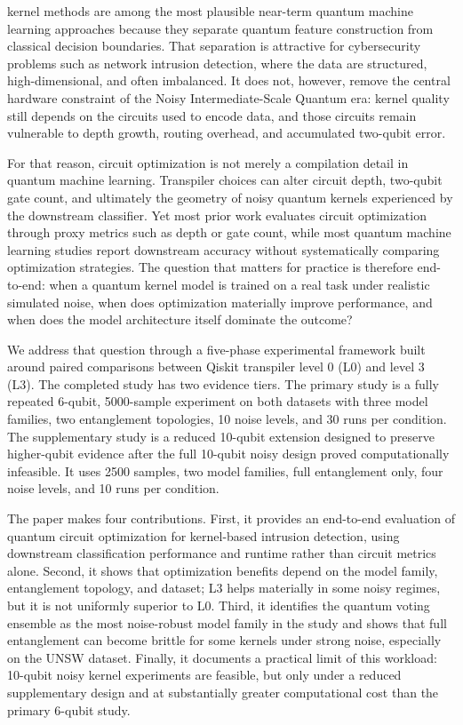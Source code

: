\documentclass{ieeeaccess}
\begin{document}
 kernel methods are among the most plausible near-term quantum machine learning approaches because they separate quantum feature construction from classical decision boundaries. That separation is attractive for cybersecurity problems such as network intrusion detection, where the data are structured, high-dimensional, and often imbalanced. It does not, however, remove the central hardware constraint of the Noisy Intermediate-Scale Quantum era: kernel quality still depends on the circuits used to encode data, and those circuits remain vulnerable to depth growth, routing overhead, and accumulated two-qubit error.

For that reason, circuit optimization is not merely a compilation detail in quantum machine learning. Transpiler choices can alter circuit depth, two-qubit gate count, and ultimately the geometry of noisy quantum kernels experienced by the downstream classifier. Yet most prior work evaluates circuit optimization through proxy metrics such as depth or gate count, while most quantum machine learning studies report downstream accuracy without systematically comparing optimization strategies. The question that matters for practice is therefore end-to-end: when a quantum kernel model is trained on a real task under realistic simulated noise, when does optimization materially improve performance, and when does the model architecture itself dominate the outcome?

We address that question through a five-phase experimental framework built around paired comparisons between Qiskit transpiler level 0 (L0) and level 3 (L3). The completed study has two evidence tiers. The primary study is a fully repeated 6-qubit, 5000-sample experiment on both datasets with three model families, two entanglement topologies, 10 noise levels, and 30 runs per condition. The supplementary study is a reduced 10-qubit extension designed to preserve higher-qubit evidence after the full 10-qubit noisy design proved computationally infeasible. It uses 2500 samples, two model families, full entanglement only, four noise levels, and 10 runs per condition.

The paper makes four contributions. First, it provides an end-to-end evaluation of quantum circuit optimization for kernel-based intrusion detection, using downstream classification performance and runtime rather than circuit metrics alone. Second, it shows that optimization benefits depend on the model family, entanglement topology, and dataset; L3 helps materially in some noisy regimes, but it is not uniformly superior to L0. Third, it identifies the quantum voting ensemble as the most noise-robust model family in the study and shows that full entanglement can become brittle for some kernels under strong noise, especially on the UNSW dataset. Finally, it documents a practical limit of this workload: 10-qubit noisy kernel experiments are feasible, but only under a reduced supplementary design and at substantially greater computational cost than the primary 6-qubit study.
\end{document}

